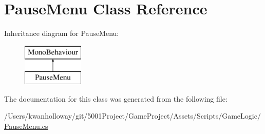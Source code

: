 \hypertarget{class_pause_menu}{}\section{Pause\+Menu Class Reference}
\label{class_pause_menu}
Inheritance diagram for Pause\+Menu\+:\begin{figure}[H]
\begin{center}
\leavevmode
\includegraphics[height=2.000000cm]{class_pause_menu}
\end{center}
\end{figure}


The documentation for this class was generated from the following file\+:\begin{DoxyCompactItemize}
\item 
/\+Users/kwanholloway/git/5001\+Project/\+Game\+Project/\+Assets/\+Scripts/\+Game\+Logic/\hyperlink{_pause_menu_8cs}{Pause\+Menu.\+cs}\end{DoxyCompactItemize}
